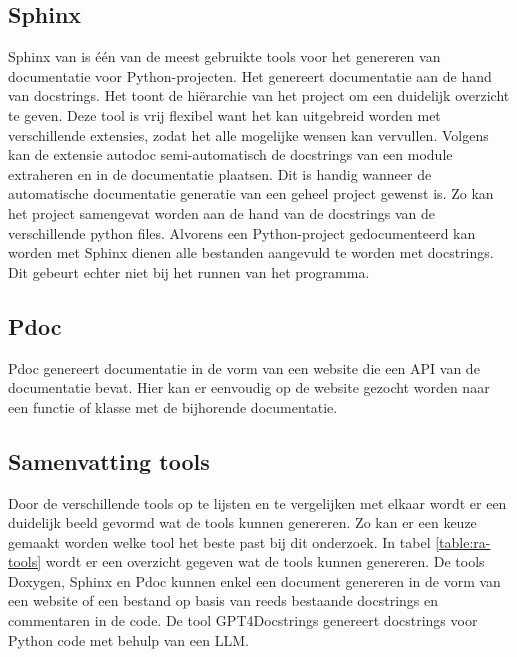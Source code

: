 \subsection{Sphinx}
Sphinx van \textcite{Sphinx2023} is één van de meest gebruikte tools voor het genereren van documentatie voor Python-projecten.
Het genereert documentatie aan de hand van docstrings. Het toont de hiërarchie van het project om een duidelijk overzicht te geven.
Deze tool is vrij flexibel want het kan uitgebreid worden met verschillende extensies, zodat het alle mogelijke wensen kan vervullen.
Volgens \textcite{Sphinx2023} kan de extensie autodoc semi-automatisch de docstrings van een module extraheren en in de documentatie plaatsen. 
Dit is handig wanneer de automatische documentatie generatie van een geheel project gewenst is. Zo kan het project samengevat worden aan de hand van de docstrings van de verschillende python files. 
Alvorens een Python-project gedocumenteerd kan worden met Sphinx \autocite{Sphinx2023} dienen alle bestanden aangevuld te worden met docstrings.
Dit gebeurt echter niet bij het runnen van het programma.

\subsection{Pdoc}
Pdoc \autocite{GallantHils2023} genereert documentatie in de vorm van een website die een API van de documentatie bevat. 
Hier kan er eenvoudig op de website gezocht worden naar een functie of klasse met de bijhorende documentatie.

\begin{table}[h!]
\centering
{}
\caption{Vergelijking documentatie tools}
\label{table:vgl-tools}
\end{table}

\subsection{Samenvatting tools}
\label{sec:samenvatting-tools}
Door de verschillende tools op te lijsten en te vergelijken met elkaar wordt er een duidelijk beeld gevormd wat de tools kunnen genereren.
Zo kan er een keuze gemaakt worden welke tool het beste past bij dit onderzoek.
In tabel \ref{table:ra-tools} wordt er een overzicht gegeven wat de tools kunnen genereren.
De tools Doxygen, Sphinx en Pdoc kunnen enkel een document genereren in de vorm van een website of een bestand op basis van reeds bestaande docstrings en commentaren in de code.
De tool GPT4Docstrings genereert docstrings voor Python code met behulp van een LLM.

